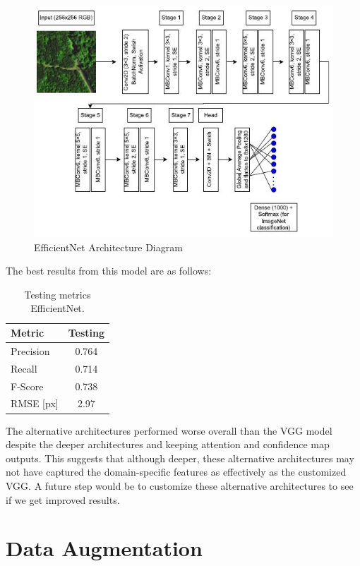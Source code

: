 \documentclass[conference]{ieeetran}
\begin{document}
\begin{figure}[htbp]
  \centering
  \includegraphics[width=\linewidth]{EfficientNet.JPG}
  \caption{EfficientNet Architecture Diagram}
  \label{fig:my_label}
\end{figure}

The best results from this model are as follows:

\begin{table}[htbp]
  \centering
  \begin{tabular}{lc}
    \hline
    \textbf{Metric} & \textbf{Testing} \\
    \hline
    Precision & 0.764 \\
    Recall    & 0.714 \\
    F-Score   & 0.738 \\
    RMSE [px] & 2.97 \\
    \hline
  \end{tabular}
  \caption{Testing metrics EfficientNet.}
  \label{tab:testing_metrics}
\end{table}

The alternative architectures performed worse overall than the VGG model despite the deeper architectures and keeping attention and confidence map outputs. This suggests that although deeper, these alternative architectures may not have captured the domain-specific features as effectively as the customized VGG. A future step would be to customize these alternative architectures to see if we get improved results.

\section{Data Augmentation} 
\end{document}
